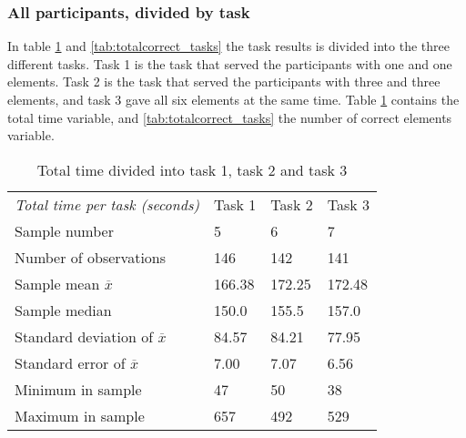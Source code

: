 \subsubsection{All participants, divided by task}\label{sec:taskdivided_all}

In table \ref{tab:totaltime_tasks} and \ref{tab:totalcorrect_tasks} the task results is divided into the three different tasks. Task 1 is the task that served the participants with one and one elements. Task 2 is the task that served the participants with three and three elements, and task 3 gave all six elements at the same time. Table  \ref{tab:totaltime_tasks} contains the total time variable, and \ref{tab:totalcorrect_tasks} the number of correct elements variable. 

\begin{table}[H]
	\centering
	\begin{tabular}{l|l|l|l}
		\textit{Total time per task (seconds)} & Task 1 & Task 2 & Task 3 \\ 		
		Sample number & 5  & 6  & 7    \\ \hline
		Number of observations & 146    & 142      & 141     \\
		Sample mean $\overline{x}$  & 166.38  &  172.25   &   172.48  \\
		Sample median & 150.0  &  155.5  & 157.0  \\
		Standard deviation of $\overline{x}$   & 84.57  & 84.21  & 77.95   \\
		Standard error of $\overline{x}$   & 7.00 & 7.07 & 6.56 \\
		Minimum in sample    & 47  & 50 &   38   \\
		Maximum in sample   & 657 & 492  & 529 \\ \hline
	\end{tabular}
	\caption[Total time, divided into task 1, 2 and 3]{Total time divided into task 1, task 2 and task 3}
	\label{tab:totaltime_tasks}
\end{table}

